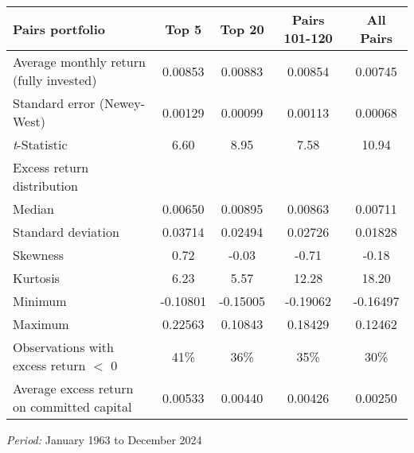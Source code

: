 \begin{table}[H]
\centering
\label{tab:excess_returns}
\footnotesize
\begin{tabular}{lcccc}
\toprule
Pairs portfolio & Top 5 & Top 20 & Pairs 101-120 & All Pairs \\
\midrule
Average monthly return (fully invested) & 0.00853 & 0.00883 & 0.00854 & 0.00745 \\
Standard error (Newey-West) & 0.00129 & 0.00099 & 0.00113 & 0.00068 \\
\textit{t}-Statistic & 6.60 & 8.95 & 7.58 & 10.94 \\
Excess return distribution & & & & \\
\quad Median & 0.00650 & 0.00895 & 0.00863 & 0.00711 \\
\quad Standard deviation & 0.03714 & 0.02494 & 0.02726 & 0.01828 \\
\quad Skewness & 0.72 & -0.03 & -0.71 & -0.18 \\
\quad Kurtosis & 6.23 & 5.57 & 12.28 & 18.20 \\
\quad Minimum & -0.10801 & -0.15005 & -0.19062 & -0.16497 \\
\quad Maximum & 0.22563 & 0.10843 & 0.18429 & 0.12462 \\
\quad Observations with excess return $<$ 0 & 41\% & 36\% & 35\% & 30\% \\
Average excess return on committed capital & 0.00533 & 0.00440 & 0.00426 & 0.00250 \\
\bottomrule
\end{tabular}

\medskip 
\textit{Period:} January 1963 to December 2024
\end{table}
